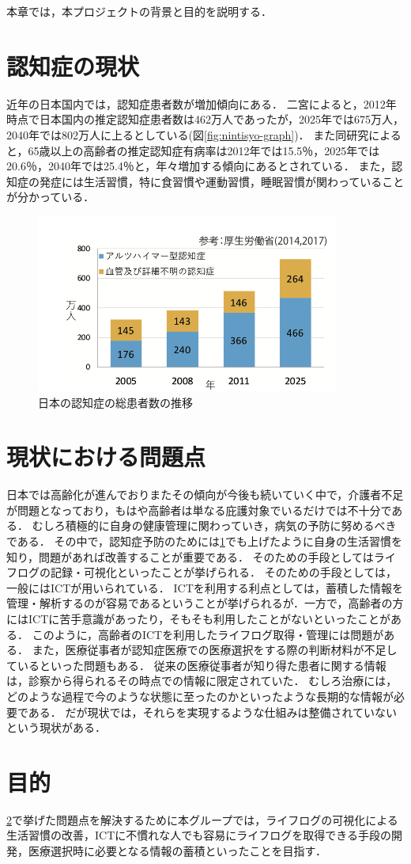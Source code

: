 \documentclass[../report]{subfiles}
\begin{document}
本章では，本プロジェクトの背景と目的を説明する．

\section{認知症の現状} \label{sec:genzyou}
近年の日本国内では，認知症患者数が増加傾向にある．
二宮によると，2012年時点で日本国内の推定認知症患者数は462万人であったが，2025年では675万人，2040年では802万人に上るとしている(図\ref{fig:nintisyo-graph})．
また同研究によると，65歳以上の高齢者の推定認知症有病率は2012年では15.5％，2025年では20.6％，2040年では25.4％と，年々増加する傾向にあるとされている．
また，認知症の発症には生活習慣，特に食習慣や運動習慣，睡眠習慣が関わっていることが分かっている．
\begin{figure}[htbp]
    \begin{center}
        \includegraphics[width=10cm]{imgs/ninchisyo-graph.png}
        \caption{日本の認知症の総患者数の推移}
        \label{fig:ninchisyo-graph}
    \end{center}
\end{figure}

\section{現状における問題点} \label{sec:mondai}
日本では高齢化が進んでおりまたその傾向が今後も続いていく中で，介護者不足が問題となっており，もはや高齢者は単なる庇護対象でいるだけでは不十分である．
むしろ積極的に自身の健康管理に関わっていき，病気の予防に努めるべきである．
その中で，認知症予防のためには\ref{sec:genzyou}でも上げたように自身の生活習慣を知り，問題があれば改善することが重要である．
そのための手段としてはライフログの記録・可視化といったことが挙げられる．
そのための手段としては，一般にはICTが用いられている．
ICTを利用する利点としては，蓄積した情報を管理・解析するのが容易であるということが挙げられるが．一方で，高齢者の方にはICTに苦手意識があったり，そもそも利用したことがないといったことがある．
このように，高齢者のICTを利用したライフログ取得・管理には問題がある．
また，医療従事者が認知症医療での医療選択をする際の判断材料が不足しているといった問題もある．
従来の医療従事者が知り得た患者に関する情報は，診察から得られるその時点での情報に限定されていた．
むしろ治療には，どのような過程で今のような状態に至ったのかといったような長期的な情報が必要である．
だが現状では，それらを実現するような仕組みは整備されていないという現状がある．

\section{目的}
\ref{sec:mondai}で挙げた問題点を解決するために本グループでは，ライフログの可視化による生活習慣の改善，ICTに不慣れな人でも容易にライフログを取得できる手段の開発，医療選択時に必要となる情報の蓄積といったことを目指す．
\end{document}
